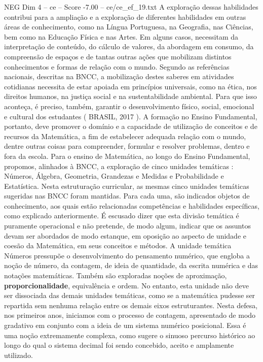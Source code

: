 \begin{textsample}{NEG Dim 4 – ce – Score -7.00 – ce/ce\_ef\_19.txt}
A exploração dessas habilidades contribui para a ampliação e a exploração de diferentes habilidades em outras áreas de conhecimento, como na Língua Portuguesa, na Geografia, nas Ciências, bem como na Educação Física e nas Artes.
Em alguns casos, necessitam da interpretação de conteúdo, do cálculo de valores, da abordagem em consumo, da compreensão de espaços e de tantas outras ações que mobilizam distintos conhecimentos e formas de relação com o mundo.
Segundo as referências nacionais, descritas na BNCC, a mobilização destes saberes em atividades cotidianas necessita de estar apoiada em princípios universais, como na ética, nos direitos humanos, na justiça social e na sustentabilidade ambiental.
Para que isso aconteça, é preciso, também, garantir o desenvolvimento físico, social, emocional e cultural dos estudantes ( BRASIL, 2017 ).
A formação no Ensino Fundamental, portanto, deve promover o domínio e a capacidade de utilização de conceitos e de recursos da Matemática, a fim de estabelecer adequada relação com o mundo, dentre outras coisas para compreender, formular e resolver problemas, dentro e fora da escola.
Para o ensino de Matemática, ao longo do Ensino Fundamental, propomos, alinhados à BNCC, a exploração de cinco unidades temáticas : Números, Álgebra, Geometria, Grandezas e Medidas e Probabilidade e Estatística.
Nesta estruturação curricular, as mesmas cinco unidades temáticas sugeridas nas BNCC foram mantidas.
Para cada uma, são indicados objetos de conhecimento, aos quais estão relacionadas competências e habilidades específicas, como explicado anteriormente.
É escusado dizer que esta divisão temática é puramente operacional e não pretende, de modo algum, indicar que os assuntos devam ser abordados de modo estanque, em oposição ao aspecto de unidade e coesão da Matemática, em seus conceitos e métodos.
A unidade temática Números pressupõe o desenvolvimento do pensamento numérico, que engloba a noção de número, da contagem, de ideia de quantidade, da escrita numérica e das notações matemáticas.
Também são exploradas noções de aproximação, \textbf{proporcionalidade}, equivalência e ordem.
No entanto, esta unidade não deve ser dissociada das demais unidades temáticas, como se a matemática pudesse ser repartida sem nenhuma relação entre os demais eixos estruturantes.
Nesta defesa, nos primeiros anos, iniciamos com o processo de contagem, apresentado de modo gradativo em conjunto com a ideia de um sistema numérico posicional.
Essa é uma noção extremamente complexa, como sugere o sinuoso percurso histórico ao longo do qual o sistema decimal foi sendo concebido, aceito e amplamente utilizado.

\end{textsample}
